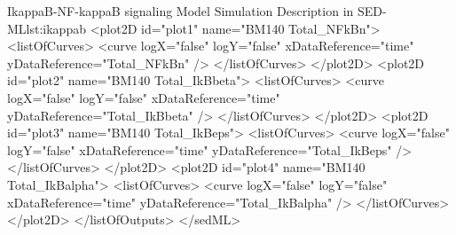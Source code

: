 \begin{myXmlLst}{IkappaB-NF-kappaB signaling Model Simulation Description in SED-ML}{lst:ikappab}
    <plot2D id="plot1" name="BM140 Total_NFkBn">
      <listOfCurves>
        <curve logX="false" logY="false" xDataReference="time" 
        yDataReference="Total_NFkBn" />
      </listOfCurves>
    </plot2D>
    <plot2D id="plot2" name="BM140 Total_IkBbeta">
      <listOfCurves>
        <curve logX="false" logY="false" xDataReference="time"
        yDataReference="Total_IkBbeta" />
      </listOfCurves>
    </plot2D>
    <plot2D id="plot3" name="BM140 Total_IkBeps">
      <listOfCurves>
        <curve logX="false" logY="false" xDataReference="time"
        yDataReference="Total_IkBeps" />
      </listOfCurves>
    </plot2D>
    <plot2D id="plot4" name="BM140 Total_IkBalpha">
      <listOfCurves>
        <curve logX="false" logY="false" xDataReference="time" 
        yDataReference="Total_IkBalpha" />
      </listOfCurves>
    </plot2D>
  </listOfOutputs>
</sedML>
\end{myXmlLst}



